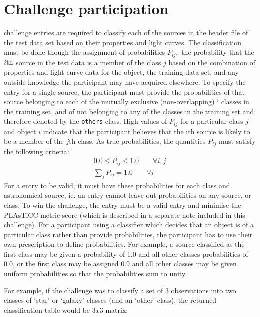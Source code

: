 \documentclass[\docopts]{\docclass}
\begin{document}
\section{Challenge participation}
\label{sec:conclusion}
{\plasticc} challenge entries are required to classify each of the sources in the header file of the test data set  based on their properties and light curves. The classification must be done though the assignment of probabilities $P_{ij},$ 
the probability that the $i\rm{th}$ source in the test data is a member of the class $j$ based on the combination of properties and light curve data for the object, the training data set, and any outside knowledge the participant may have acquired elsewhere. To specify the entry for a single source, the participant must provide the probabilities of that source belonging to each of the mutually exclusive (non-overlapping) `{{\numclasses}}  classes in the training set, and of not belonging to any of the classes in the training set and therefore denoted by the {\tt others} class. High values of $P_{ij}$ for a particular class $j$ and object $i$ indicate that the participant believes that the ith source is likely to be a member of the $j$th class. 
As true probabilities, the quantities $P_{ij}$ must satisfy the following criteria:
\begin{eqnarray*}
0.0 \leq P_{ij} \leq 1.0 \qquad \forall i, j \nonumber \\
\sum_{j} P_{ij} = 1.0 \qquad \forall i
\nonumber
\end{eqnarray*}
For a {\plasticc} entry to be valid, it must have these probabilities for each class and astronomical source, ie. an entry cannot leave out probabilities on any source, or class. To win the challenge, the entry must be a valid entry and minimise the PLAsTiCC metric score (which is described in a separate note included in this challenge). 
For a participant using a classifier which decides that an object is of a particular class rather than provide probabilities, the participant has to use their own prescription to define probabilities. For example, a source classified as the first class may be given a probability of 1.0 and all other classes probabilities of 0.0, or the first class may be assigned 0.9 and all other classes may be given uniform probabilities so that the probabilities sum to unity. 

For example, if the challenge was to classify a set of 3 observations into two classes of `star' or `galaxy' classes (and an `other' class), the returned classification table would be $3x3$ matrix:
\end{document}
